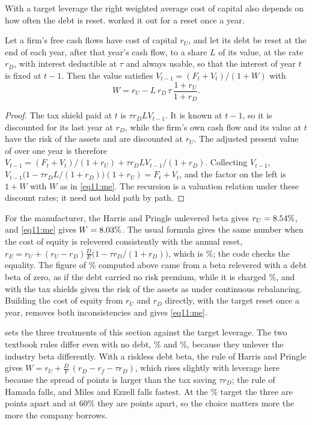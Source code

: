 \begin{chapterrefs}
With a target leverage the right weighted average cost of capital also depends on how often the debt
is reset. \textcite{miles1980} worked it out for a reset once a year.

\begin{proposition}\label{prop11:me}
Let a firm's free cash flows have cost of capital $r_U$, and let its debt be reset at the end of each
year, after that year's cash flow, to a share $L$ of its value, at the rate $r_D$, with interest
deductible at $\tau$ and always usable, so that the interest of year $t$ is fixed at $t-1$. Then the value
satisfies $V_{t-1}=(F_t+V_t)/(1+W)$ with
\begin{equation}\label{eq11:me}
  W=r_U-L\,r_D\,\tau\,\frac{1+r_U}{1+r_D}.
\end{equation}
\end{proposition}

\begin{proof}
The tax shield paid at $t$ is $\tau r_DLV_{t-1}$. It is known at $t-1$, so it is discounted for its last
year at $r_D$, while the firm's own cash flow and its value at $t$ have the risk of the assets and are
discounted at $r_U$. The adjusted present value of \textcite{myers1974} over one year is therefore
$V_{t-1}=(F_t+V_t)/(1+r_U)+\tau r_DLV_{t-1}/(1+r_D)$. Collecting $V_{t-1}$,
$V_{t-1}\bigl(1-\tau r_DL/(1+r_D)\bigr)(1+r_U)=F_t+V_t$, and the factor on the left is $1+W$ with $W$ as
in \cref{eq11:me}. The recursion is a valuation relation under these discount rates; it need not
hold path by path.
\end{proof}

For the manufacturer, the Harris and Pringle unlevered beta gives $r_U=8.54\%$, and
\cref{eq11:me} gives $W=8.03\%$. The usual formula gives the same number when the cost of equity is
relevered consistently with the annual reset, $r_E=r_U+(r_U-r_D)\frac DE\bigl(1-\tau r_D/(1+r_D)\bigr)$,
which is \wkReMe\%; the code checks the equality. The figure of \wkWHp\% computed above came from a
beta relevered with a debt beta of zero, as if the debt carried no risk premium, while it is charged
\wkRd\%, and with the tax shields given the risk of the assets as under continuous rebalancing. Building the
cost of equity from $r_U$ and $r_D$ directly, with the target reset once a year, removes both
inconsistencies and gives \cref{eq11:me}.

 sets the three treatments of this section against the target leverage. The two textbook rules differ
even with no debt, \wrHamZero\% and \wrHpZero\%, because they unlever the industry beta differently.
With a riskless debt beta, the rule of Harris and Pringle gives $W=r_U+\frac DV\,(r_D-r_f-\tau r_D)$,
which rises slightly with leverage here because the spread of \wkSpread{} points is larger than the tax
saving $\tau r_D$; the rule of Hamada falls, and Miles and Ezzell falls fastest. At the \wkTarget\% target
the three are \wrSpreadTarget{} points apart and at 60\% they are \wrSpreadSixty{} points apart, so the
choice matters more the more the company borrows.


\end{chapterrefs}
